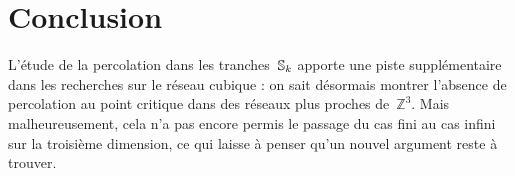 \newpage
\section*{Conclusion}
L'étude de la percolation dans les tranches~$\mathbb{S}_k$ apporte une piste supplémentaire dans les recherches sur le réseau cubique : on sait désormais montrer l'absence de percolation au point critique dans des réseaux plus \og{}proches\fg{} de~$\mathbb{Z}^3$. Mais malheureusement, cela n'a pas encore permis le passage du cas fini au cas infini sur la troisième dimension, ce qui laisse à penser qu'un nouvel argument reste à trouver.
